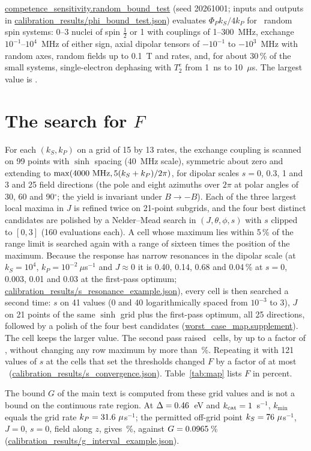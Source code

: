 \documentclass[11pt]{article}
\begin{document}
\url{competence_sensitivity.random_bound_test} (seed 20261001; inputs and
outputs in \url{calibration_results/phi_bound_test.json}) evaluates
$\Phi_Pk_S/4k_P$ for \nBoundTest\ random spin systems: 0--3 nuclei of spin
$\tfrac12$ or 1 with couplings of 1--300~MHz, exchange $10^{-1}$--$10^4$~MHz of
either sign, axial dipolar tensors of $-10^{-1}$ to $-10^{3}$~MHz with random
axes, random fields up to 0.1~T and rates, and, for about 30\,\% of the small
systems, single-electron dephasing with $T_2^e$ from 1~ns to 10~$\mu$s. The
largest value is \maxBoundRatio.

\section{The search for $F$}
For each $(k_S,k_P)$ on a grid of 15 by 13 rates, the exchange coupling is
scanned on 99 points with $\sinh$ spacing (40~MHz scale), symmetric about zero
and extending to $\max(4000~{\rm MHz},5(k_S+k_P)/2\pi)$, for dipolar scales
$s = 0$, 0.3, 1 and 3 and 25 field directions (the pole and eight azimuths over
$2\pi$ at polar angles of 30, 60 and 90$^\circ$; the yield is invariant under
$B\to-B$). Each of the three largest local maxima in $J$ is refined twice on
21-point subgrids, and the four best distinct candidates are polished by a
Nelder--Mead search in $(J,\theta,\phi,s)$ with $s$ clipped to $[0,3]$ (160
evaluations each). A cell whose maximum lies within 5\,\% of the range limit is
searched again with a range of sixteen times the position of the maximum.
Because the response has narrow resonances in the dipolar scale (at
$k_S = 10^4$, $k_P = 10^{-2}~\mu$s$^{-1}$ and $J\approx0$ it is 0.40, 0.14, 0.68
and 0.04\,\% at $s = 0$, 0.003, 0.01 and 0.03 at the first-pass optimum;
\url{calibration_results/s_resonance_example.json}), every cell is then searched a
second time: $s$ on 41 values (0 and 40 logarithmically spaced from $10^{-3}$ to
3), $J$ on 21 points of the same $\sinh$ grid plus the first-pass optimum, all
25 directions, followed by a polish of the four best candidates
(\url{worst_case_map.supplement}). The cell keeps the larger value.
The second pass raised \nSuppRaised\ cells, by up to a factor of
\suppMaxRatio, without changing any row maximum by more than
\rowMaxChange\,\%. Repeating it with 121 values of $s$ at the cells that
set the thresholds changed $F$ by a factor of at most \convMaxRatio\
(\url{calibration_results/s_convergence.json}). Table~\ref{tab:map}
lists $F$ in percent.

The bound $G$ of the main text is computed from these grid values and is not a
bound on the continuous rate region. At $\Delta=0.46$~eV and
$k_{\rm cat}=1$~s$^{-1}$, $k_{\min}$ equals the grid rate $k_P=31.6~\mu$s$^{-1}$;
the permitted off-grid point $k_S=76~\mu$s$^{-1}$, $J=0$, $s=0$, field along
$z$, gives \intMFE\,\%, against $G=0.0965$\,\%
(\url{calibration_results/g_interval_example.json}).
\end{document}
